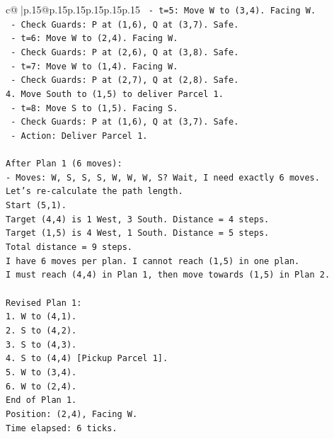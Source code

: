\documentclass{article}
\begin{document}
{\begin{supertabular}{c@{$\;$}|p{.15\linewidth}@{}p{.15\linewidth}p{.15\linewidth}p{.15\linewidth}p{.15\linewidth}p{.15\linewidth}}
{{{\texttt{   {-} t=5: Move W to (3,4). Facing W.} \\
\texttt{     {-} Check Guards: P at (1,6), Q at (3,7). Safe.} \\
\texttt{   {-} t=6: Move W to (2,4). Facing W.} \\
\texttt{     {-} Check Guards: P at (2,6), Q at (3,8). Safe.} \\
\texttt{   {-} t=7: Move W to (1,4). Facing W.} \\
\texttt{     {-} Check Guards: P at (2,7), Q at (2,8). Safe.} \\
\texttt{4. Move South to (1,5) to deliver Parcel 1.} \\
\texttt{   {-} t=8: Move S to (1,5). Facing S.} \\
\texttt{     {-} Check Guards: P at (1,6), Q at (3,7). Safe.} \\
\texttt{     {-} Action: Deliver Parcel 1.} \\
\\ 
\texttt{After Plan 1 (6 moves):} \\
\texttt{{-} Moves: W, S, S, S, W, W, W, S? Wait, I need exactly 6 moves.} \\
\texttt{Let's re{-}calculate the path length.} \\
\texttt{Start (5,1).} \\
\texttt{Target (4,4) is 1 West, 3 South. Distance = 4 steps.} \\
\texttt{Target (1,5) is 4 West, 1 South. Distance = 5 steps.} \\
\texttt{Total distance = 9 steps.} \\
\texttt{I have 6 moves per plan. I cannot reach (1,5) in one plan.} \\
\texttt{I must reach (4,4) in Plan 1, then move towards (1,5) in Plan 2.} \\
\\ 
\texttt{Revised Plan 1:} \\
\texttt{1. W to (4,1).} \\
\texttt{2. S to (4,2).} \\
\texttt{3. S to (4,3).} \\
\texttt{4. S to (4,4) {[}Pickup Parcel 1{]}.} \\
\texttt{5. W to (3,4).} \\
\texttt{6. W to (2,4).} \\
\texttt{End of Plan 1.} \\
\texttt{Position: (2,4), Facing W.} \\
\texttt{Time elapsed: 6 ticks.} \\
}}}
\end{supertabular}}
\end{document}
